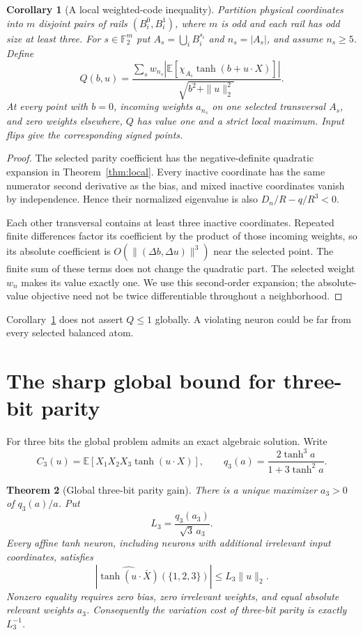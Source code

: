 \documentclass[11pt]{article}
\newtheorem{theorem}{Theorem}
\newtheorem{corollary}[theorem]{Corollary}
\theoremstyle{remark}\newtheorem{remark}[theorem]{Remark}
\newcommand{\E}{\mathbb E}\newcommand{\R}{\mathbb R}
\newcommand{\F}{\mathbb F}\newcommand{\one}{\mathbf 1}
\begin{document}
\begin{corollary}[A local weighted-code inequality]\label{cor:local-code}
Partition physical coordinates into $m$ disjoint pairs of rails
$(B_i^0,B_i^1)$, where $m$ is odd and each rail has odd size at least three.
For $s\in\F_2^m$ put $A_s=\bigcup_i B_i^{s_i}$ and $n_s=|A_s|$, and
assume $n_s\ge5$. Define
\[
 Q(b,u)=\frac{\sum_s w_{n_s}
      |\E[\chi_{A_s}\tanh(b+u\cdot X)]|}
                  {\sqrt{b^2+\|u\|_2^2}}.
\]
At every point with $b=0$, incoming weights $a_{n_s}$ on one selected
transversal $A_s$, and zero weights elsewhere, $Q$ has value one and a
strict local maximum. Input flips give the corresponding signed points.
\end{corollary}
\begin{proof}
The selected parity coefficient has the negative-definite quadratic
expansion in Theorem~\ref{thm:local}. Every inactive coordinate has the
same numerator second derivative as the bias, and mixed inactive
coordinates vanish by independence. Hence their normalized eigenvalue
is also $D_n/R-q/R^3<0$.

Each other transversal contains at least three inactive coordinates.
Repeated finite differences factor its coefficient by the product of
those incoming weights, so its absolute coefficient is
$O(\|(\Delta b,\Delta u)\|^3)$ near the selected point. The finite sum
of these terms does not change the quadratic part. The selected weight
$w_n$ makes its value exactly one. We use this second-order expansion;
the absolute-value objective need not be twice differentiable throughout
a neighborhood.
\end{proof}

Corollary~\ref{cor:local-code} does not assert $Q\le1$ globally. A
violating neuron could be far from every selected balanced atom.

\section{The sharp global bound for three-bit parity}

For three bits the global problem admits an exact algebraic solution.
Write
\[
 C_3(u)=\E[X_1X_2X_3\tanh(u\cdot X)],\qquad
 q_3(a)=\frac{2\tanh^3a}{1+3\tanh^2a}.
\]

\begin{theorem}[Global three-bit parity gain]\label{thm:three}
There is a unique maximizer $a_3>0$ of $q_3(a)/a$. Put
\[
 L_3=\frac{q_3(a_3)}{\sqrt3\,a_3}.
\]
Every affine tanh neuron, including neurons with additional irrelevant
input coordinates, satisfies
\[
 |\widehat{\tanh(u\cdot\bar X)}(\{1,2,3\})|
 \le L_3\|u\|_2.
\]
Nonzero equality requires zero bias, zero irrelevant weights, and equal
absolute relevant weights $a_3$. Consequently the variation cost of
three-bit parity is exactly $L_3^{-1}$.
\end{theorem}
\end{document}
